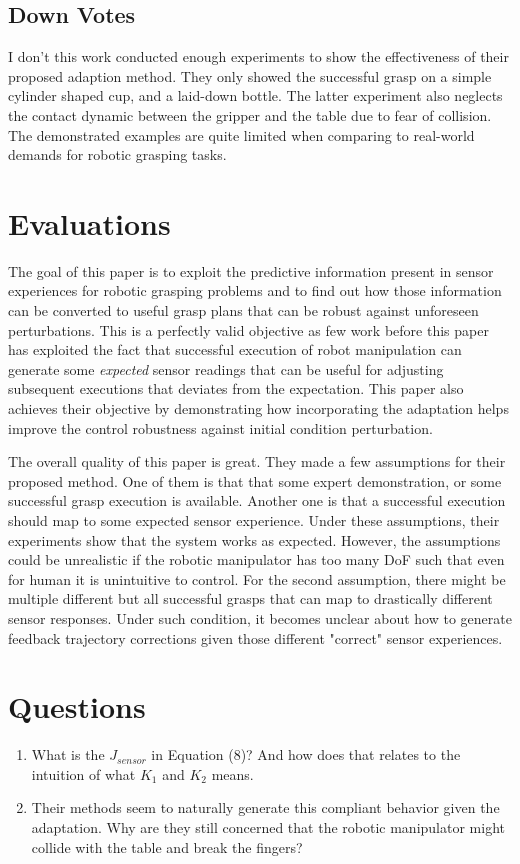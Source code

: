 \documentclass[10pt, twocolumn]{article}
\begin{document}
\subsection{Down Votes}
I don't this work conducted enough experiments to show the effectiveness of
their proposed adaption method. They only showed the successful grasp on
a simple cylinder shaped cup, and a laid-down bottle. The latter experiment
also neglects the contact dynamic between the gripper and the table
due to fear of collision. The demonstrated examples are quite limited
when comparing to real-world demands for robotic grasping tasks.

\section{Evaluations}
The goal of this paper is to exploit the predictive information present
in sensor experiences for robotic grasping problems and to find out how those information
can be converted to useful grasp plans that can be robust against
unforeseen perturbations. This is a perfectly valid objective as few work
before this paper has exploited the fact that successful execution of
robot manipulation can generate some {\it expected} sensor readings that
can be useful for adjusting subsequent executions that deviates from
the expectation. This paper also achieves their objective by demonstrating
how incorporating the adaptation helps improve the control robustness
against initial condition perturbation.

The overall quality of this paper is great. They made a few assumptions for
their proposed method. One of them is that
that some expert demonstration, or some successful grasp execution is
available. Another one is that a successful execution should map
to some expected sensor experience. Under these assumptions, their experiments
show that the system works as expected. However, the assumptions could
be unrealistic if the robotic manipulator has too many DoF such that even
for human it is unintuitive to control. For the second assumption, there might
be multiple different but all successful grasps that can map to drastically
different sensor responses. Under such condition, it becomes unclear about
how to generate feedback trajectory corrections given those different
"correct" sensor experiences.

\section{Questions}
\begin{enumerate}
  \item What is the $J_{sensor}$ in Equation (8)? And how does that relates
    to the intuition of what $K_1$ and $K_2$ means.
  \item Their methods seem to naturally generate this compliant behavior
    given the adaptation. Why are they still concerned that the robotic
    manipulator might collide with the table and break the fingers?
\end{enumerate}
\end{document}
